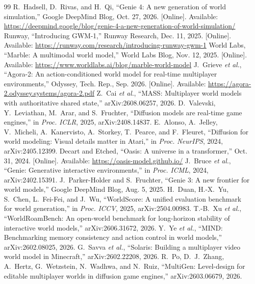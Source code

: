 \documentclass[conference]{IEEEtran}
\begin{document}
\begin{thebibliography}{99}
 R.~Hadsell, D.~Rivas, and H.~Qi, ``Genie 4: A new generation of world simulation,'' Google DeepMind Blog, Oct. 27, 2026. [Online]. Available: \url{https://deepmind.google/blog/genie-4-a-new-generation-of-world-simulation/}
 Runway, ``Introducing GWM-1,'' Runway Research, Dec. 11, 2025. [Online]. Available: \url{https://runway.com/research/introducing-runway-gwm-1}
 World Labs, ``Marble: A multimodal world model,'' World Labs Blog, Nov. 12, 2025. [Online]. Available: \url{https://www.worldlabs.ai/blog/marble-world-model}
 J.~Grieve \emph{et al.}, ``Agora-2: An action-conditioned world model for real-time multiplayer environments,'' Odyssey, Tech. Rep., Sep. 2026. [Online]. Available: \url{https://agora-2.odyssey.systems/agora-2.pdf}
 Z.~Cai \emph{et al.}, ``MASS: Multiplayer world models with authoritative shared state,'' arXiv:2608.06257, 2026.
 D.~Valevski, Y.~Leviathan, M.~Arar, and S.~Fruchter, ``Diffusion models are real-time game engines,'' in \emph{Proc. ICLR}, 2025, arXiv:2408.14837.
 E.~Alonso, A.~Jelley, V.~Micheli, A.~Kanervisto, A.~Storkey, T.~Pearce, and F.~Fleuret, ``Diffusion for world modeling: Visual details matter in Atari,'' in \emph{Proc. NeurIPS}, 2024, arXiv:2405.12399.
 Decart and Etched, ``Oasis: A universe in a transformer,'' Oct. 31, 2024. [Online]. Available: \url{https://oasis-model.github.io/}
 J.~Bruce \emph{et al.}, ``Genie: Generative interactive environments,'' in \emph{Proc. ICML}, 2024, arXiv:2402.15391.
 J.~Parker-Holder and S.~Fruchter, ``Genie 3: A new frontier for world models,'' Google DeepMind Blog, Aug. 5, 2025.
 H.~Duan, H.-X.~Yu, S.~Chen, L.~Fei-Fei, and J.~Wu, ``WorldScore: A unified evaluation benchmark for world generation,'' in \emph{Proc. ICCV}, 2025, arXiv:2504.00983.
 T.-B.~Xu \emph{et al.}, ``WorldRoamBench: An open-world benchmark for long-horizon stability of interactive world models,'' arXiv:2606.31672, 2026.
 Y.~Ye \emph{et al.}, ``MIND: Benchmarking memory consistency and action control in world models,'' arXiv:2602.08025, 2026.
 G.~Savva \emph{et al.}, ``Solaris: Building a multiplayer video world model in Minecraft,'' arXiv:2602.22208, 2026.
 R.~Po, D.~J.~Zhang, A.~Hertz, G.~Wetzstein, N.~Wadhwa, and N.~Ruiz, ``MultiGen: Level-design for editable multiplayer worlds in diffusion game engines,'' arXiv:2603.06679, 2026.

\end{thebibliography}
\end{document}
